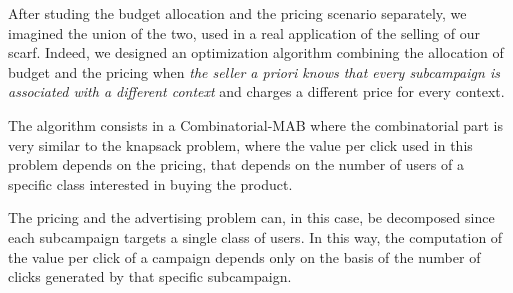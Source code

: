 After studing the budget allocation and the pricing scenario separately, we imagined the union of the two, used in a real application of the selling of our scarf.
Indeed, we designed an optimization algorithm combining the allocation of budget and the pricing when \emph{the seller a priori knows that every subcampaign is associated with a different context} and charges a different price for every context.

The algorithm consists in a Combinatorial-MAB where the combinatorial part is very similar to the knapsack problem, where the value per click used in this problem depends on the pricing, that depends on the number of users of a specific class interested in buying the product.

The pricing and the advertising problem can, in this case, be decomposed since each subcampaign targets a single class of users. In this way, the computation of the value per click of a campaign depends only on the basis of the number of clicks generated by that specific subcampaign. 